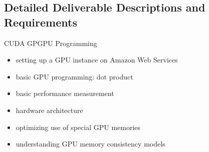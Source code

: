 \documentclass{article}[14pt]
\begin{document}
\subsection{Detailed Deliverable Descriptions and Requirements}

CUDA GPGPU Programming
\begin{itemize}
\item setting up a GPU instance on Amazon Web Services
\item basic GPU programming: dot product
\item basic performance measurement
\item hardware architecture
\item optimizing use of special GPU memories
\item understanding GPU memory consistency models
\end{itemize}
\end{document}
